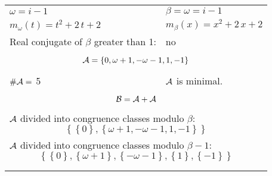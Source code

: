 \begin{exmp}
\label{ex:compareAE}


\rule{0cm}{0cm}

\begin{tabular}{ll}
$\omega=  i - 1 $  & $\beta= \omega = i - 1 $\\
$m_\omega(t)=  t^{2} + 2 \, t + 2 $  & $m_\beta(x)=  x^{2} + 2 \, x + 2 $\\
Real conjugate of $\beta$ greater than 1:   &  no \\ \hline
\multicolumn{2}{l}{\begin{minipage}{\textwidth}\begin{dmath*}\A = \left\{0, \omega + 1, -\omega - 1, 1, -1\right\}  \end{dmath*}\end{minipage} }\\
$\#\mathcal{A}= $ 5 $ $ & $\mathcal{A}$ is minimal. \\
\multicolumn{2}{l}{\begin{minipage}{\textwidth}\begin{dmath*}\B =\A+\A \end{dmath*}\end{minipage} }\\[10pt]
\multicolumn{2}{l}{\begin{minipage}{\textwidth}$\mathcal{A}$ divided into congruence classes modulo $\beta$: \begin{dmath*} \left\{\left\{0\right\}, \left\{\omega + 1, -\omega - 1, 1, -1\right\}\right\}  \end{dmath*}\end{minipage} }\\[10pt]
\multicolumn{2}{l}{\begin{minipage}{\textwidth}$\mathcal{A}$ divided into congruence classes modulo $\beta-1$: \begin{dmath*} \left\{\left\{0\right\}, \left\{\omega + 1\right\}, \left\{-\omega - 1\right\}, \left\{1\right\}, \left\{-1\right\}\right\}  \end{dmath*}\end{minipage} }\\
 & \\ \hline
 & \\
\end{tabular}


\end{exmp}

